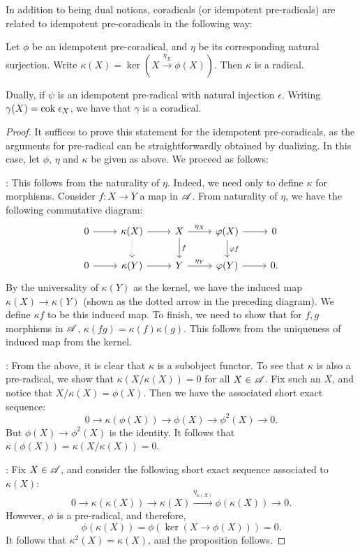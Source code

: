 In addition to being dual notions, coradicals (or idempotent 
pre-radicals) are related to idempotent pre-coradicals in the
following way:

\begin{prop}\label{prop_rad_eq_corad}
Let $\phi$ be an idempotent pre-coradical, and $\eta$ be its 
corresponding natural surjection. Write $\kappa(X) = \ker (X 
\stackrel{\eta_X}{\to} \phi(X))$. Then $\kappa$ is a radical.

Dually, if $\psi$ is an idempotent pre-radical with natural 
injection $\epsilon$. Writing $\gamma(X) = \mathrm{cok}\; \epsilon_X$, we 
have that $\gamma$ is a coradical.
\end{prop}
\begin{proof}
It suffices to prove this statement for the idempotent 
pre-coradicals, as the arguments for pre-radical can be 
straightforwardly obtained by dualizing. In this case, let $\phi$, 
$\eta$ and $\kappa$ be given as above. We proceed as follows:

: This follows from the naturality 
of $\eta$. Indeed, we need only to define $\kappa$ for morphisms. 
Consider $f: X \to Y$ a map in $\mathscr{A}$. From naturality of 
$\eta$, we have the following commutative diagram:
\[
\begin{tikzcd}
0 \arrow{r} &
\kappa(X) \arrow{r} \arrow[dotted]{d} &
X \arrow{r}{\eta_X} \arrow{d}{f} &
\phi(X) \arrow{r} \arrow{d}{\phi f} &
0 \\
0 \arrow{r} &
\kappa(Y) \arrow{r} &
Y \arrow{r}{\eta_Y} &
\phi(Y) \arrow{r} &
0.
\end{tikzcd}
\]
By the universality of $\kappa(Y)$ as the kernel, we have the 
induced map $\kappa(X) \to \kappa(Y)$ (shown as the dotted arrow 
in the preceding diagram). We define $\kappa f$ to be this induced
map. To finish, we need to show that for $f, g$ morphisms in 
$\mathscr{A}$, $\kappa(fg) = \kappa(f)\kappa(g)$. This follows from
the uniqueness of induced map from the kernel.

: From the above, it is clear 
that $\kappa$ is a subobject functor. To see that $\kappa$ is also
a pre-radical, we show that $\kappa(X/\kappa(X)) = 0$ for all $X 
\in \mathscr{A}$. Fix such an $X$, and notice that $X/\kappa(X) = 
\phi(X)$. Then we have the associated short exact sequence:
\[
0 \to \kappa(\phi(X)) \to \phi(X) \to \phi^2(X) \to 0.
\]
But $\phi(X) \to \phi^2(X)$ is the identity. It follows that 
$\kappa(\phi(X)) = \kappa(X/\kappa(X)) = 0$.

: Fix $X \in \mathscr{A}$, and consider
the following short exact sequence associated to $\kappa(X)$:
\[
0 \to \kappa(\kappa(X)) \to \kappa(X) 
   \stackrel{\eta_{\kappa(X)}}{\to} \phi(\kappa(X)) \to 0.
\]
However, $\phi$ is a pre-radical, and therefore, 
\[
\phi(\kappa(X)) = \phi(\ker(X \to \phi(X))) = 0.
\]
It follows that $\kappa^2(X) = \kappa(X)$, and the proposition 
follows.
\end{proof}

